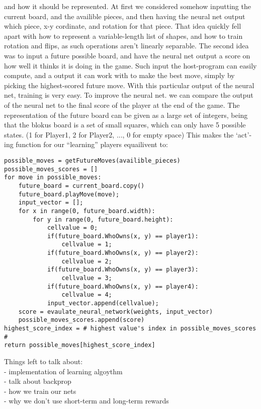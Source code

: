 \documentclass{report}
\begin{document}
	and how it should be represented. At first we considered somehow inputting the current board, and the availible pieces, and then having the neural net output which piece, x-y cordinate,
	and rotation for that piece. That idea quickly fell apart with how to represent a variable-length list of shapes, and how to train rotation and flips, as such operations aren't linearly
	separable. The second idea was to input a future possible board, and have the neural net output a score on how well it thinks it is doing in the game. Such input the host-program can easily
	compute, and a output it can work with to make the best move, simply by picking the highest-scored future move. With this particular output of the neural net, training is very easy. To
	improve the neural net. we can compare the output of the neural net to the final score of the player at the end of the game. The representation of the future board can be given as a large set of
	integers, being that the blokus board is a set of small squares, which can only have 5 possible states. (1 for Player1, 2 for Player2, ..., 0 for empty space) This makes the `act'-ing
	function for our ``learning'' players equailivent to:
	\lstset{language=Python}
	\lstset{basicstyle=\footnotesize}
	\begin{lstlisting}
possible_moves = getFutureMoves(availible_pieces)
possible_moves_scores = []
for move in possible_moves:
	future_board = current_board.copy()
	future_board.playMove(move);
	input_vector = [];
	for x in range(0, future_board.width):
		for y in range(0, future_board.height):
			cellvalue = 0;
			if(future_board.WhoOwns(x, y) == player1):
				cellvalue = 1;
			if(future_board.WhoOwns(x, y) == player2):
				cellvalue = 2;
			if(future_board.WhoOwns(x, y) == player3):
				cellvalue = 3;
			if(future_board.WhoOwns(x, y) == player4):
				cellvalue = 4;
			input_vector.append(cellvalue);
	score = evaulate_neural_network(weights, input_vector)
	possible_moves_scores.append(score)
highest_score_index = # highest value's index in possible_moves_scores #
return possible_moves[highest_score_index]
	\end{lstlisting}
	
	
	Things left to talk about:\\
		- implementation of learning algoythm\\
		- talk about backprop\\
		- how we train our nets\\
		- why we don't use short-term and long-term rewards	\\
\end{document}
